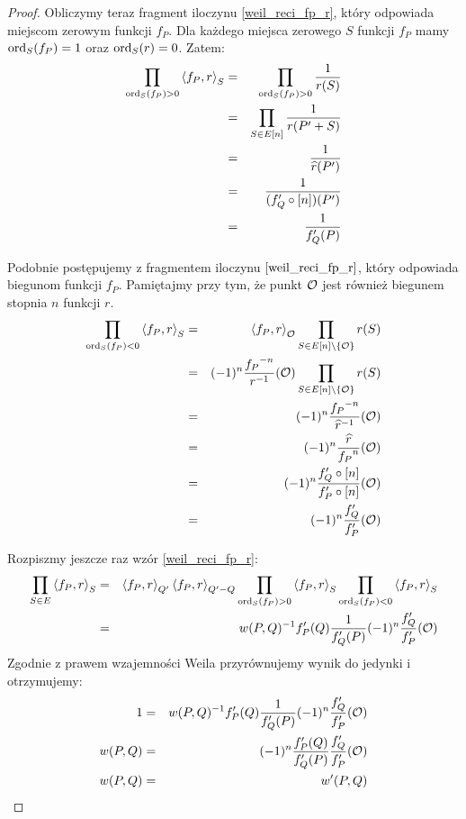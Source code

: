 \begin{proof}
\noindent
Obliczymy teraz fragment iloczynu \ref{weil_reci_fp_r},
który odpowiada miejscom zerowym funkcji $f_P$.
Dla każdego miejsca zerowego $S$ funkcji $f_P$
mamy $\operatorname{ord}_S(f_P) = 1$ oraz $\operatorname{ord}_S(r) = 0$.
Zatem:
\begin{eqnarray*}
\prod_{\operatorname{ord}_S(f_P) > 0} \left\langle f_P , r \right\rangle_{S}
& = & \prod_{\operatorname{ord}_S(f_P) > 0} \frac{1}{r(S)} \\
& = & \prod_{S \in E[n]} \frac{1}{r(P' + S)} \\
& = & \frac{1}{\widehat{r}(P')} \\
& = & \frac{1}{(f_Q' \circ [n])(P')} \\
& = & \frac{1}{f_Q'(P)}
\end{eqnarray*}

\noindent
Podobnie postępujemy z fragmentem iloczynu $\ref{weil_reci_fp_r}$,
który odpowiada biegunom funkcji $f_P$. Pamiętajmy przy tym,
że punkt $\mathcal{O}$ jest również biegunem stopnia $n$ funkcji $r$.
\begin{eqnarray*}
\prod_{\operatorname{ord}_S(f_P) < 0} \left\langle f_P , r \right\rangle_{S}
& = & \left\langle f_P , r \right\rangle_{\mathcal{O}}
      \prod_{S \in E[n] \setminus \{\mathcal{O}\}} r(S) \\
& = & (-1)^{n}\frac{{f_P}^{-n}}{r^{-1}}(\mathcal{O})
      \prod_{S \in E[n] \setminus \{\mathcal{O}\}} r(S) \\
& = & (-1)^{n}\frac{{f_P}^{-n}}{\widehat{r}^{-1}}(\mathcal{O}) \\
& = & (-1)^{n}\frac{\widehat{r}}{{f_P}^n}(\mathcal{O}) \\
& = & (-1)^{n}\frac{f_Q' \circ [n]}{f_P' \circ [n]}(\mathcal{O}) \\
& = & (-1)^{n}\frac{f_Q'}{f_P'}(\mathcal{O})
\end{eqnarray*}

\noindent
Rozpiszmy jeszcze raz wzór \ref{weil_reci_fp_r}:
\begin{eqnarray*}
\prod_{S \in E} \left\langle f_P , r \right\rangle_{S}
& = & \left\langle f_P , r \right\rangle_{Q'} \left\langle f_P , r \right\rangle_{Q' - Q}
      \prod_{\operatorname{ord}_S(f_P) > 0} \left\langle f_P , r \right\rangle_{S}
      \prod_{\operatorname{ord}_S(f_P) < 0} \left\langle f_P , r \right\rangle_{S} \\
& = & w(P, Q)^{-1} f_P'(Q) \frac{1}{f_Q'(P)} (-1)^n\frac{f_Q'}{f_P'}(\mathcal{O})
\end{eqnarray*}
Zgodnie z prawem wzajemności Weila przyrównujemy wynik do jedynki
i otrzymujemy:
\begin{eqnarray*}
1
& = &
w(P, Q)^{-1} f_P'(Q) \frac{1}{f_Q'(P)} (-1)^n\frac{f_Q'}{f_P'}(\mathcal{O})
\\
w(P, Q)
& = &
(-1)^n \frac{f_P'(Q)}{f_Q'(P)} \frac{f_Q'}{f_P'}(\mathcal{O})
\\
w(P, Q)
& = &
w'(P, Q)
\end{eqnarray*}
\end{proof}
